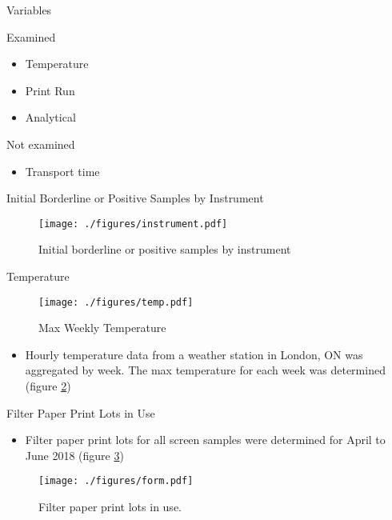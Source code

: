 \documentclass[presentation, smaller]{beamer}
\begin{document}
\begin{frame}[label={sec:orgheadline12}]{Variables}
\begin{block}{Examined}
\begin{itemize}
\item Temperature
\item Print Run
\item Analytical
\end{itemize}
\end{block}

\begin{block}{Not examined}
\begin{itemize}
\item Transport time
\end{itemize}
\end{block}
\end{frame}

\begin{frame}[label={sec:orgheadline13}]{Initial Borderline or Positive Samples by Instrument}
\begin{figure}[htb]
\centering
\texttt{[image: ./figures/instrument.pdf]}
\caption{\label{fig:instrument}
Initial borderline or positive samples by instrument}
\end{figure}
\end{frame}


\begin{frame}[label={sec:orgheadline14}]{Temperature}
\begin{figure}[htb]
\centering
\texttt{[image: ./figures/temp.pdf]}
\caption{\label{fig:temp}
Max Weekly Temperature}
\end{figure}

\begin{itemize}
\item Hourly temperature data from a weather station in London, ON was
aggregated by week. The max temperature for each week was
determined (figure \ref{fig:temp})
\end{itemize}
\end{frame}

\begin{frame}[label={sec:orgheadline15}]{Filter Paper Print Lots in Use}
\begin{itemize}
\item Filter paper print lots for all screen samples were determined for April to June 2018 (figure \ref{fig:form})
\end{itemize}

\begin{figure}[htb]
\centering
\texttt{[image: ./figures/form.pdf]}
\caption{\label{fig:form}
Filter paper print lots in use.}
\end{figure}
\end{frame}
\end{document}
